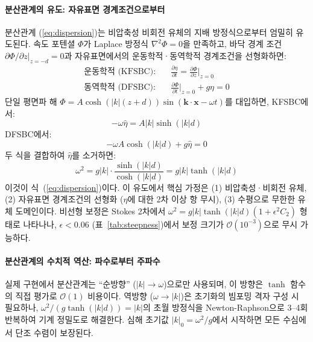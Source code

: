 \documentclass[11pt]{report}
\numberwithin{equation}{chapter}
\numberwithin{figure}{chapter}
\numberwithin{table}{chapter}
\begin{document}
\paragraph{분산관계의 유도: 자유표면 경계조건으로부터}
분산관계 (\ref{eq:dispersion})는 비압축성 비회전 유체의 지배 방정식으로부터 엄밀히 유도된다.
속도 포텐셜 $\Phi$가 Laplace 방정식 $\nabla^2\Phi = 0$을 만족하고,
바닥 경계 조건 $\partial\Phi/\partial z|_{z=-d} = 0$과
자유표면에서의 운동학적·동역학적 경계조건을 선형화하면:
\begin{align}
  \text{운동학적 (KFSBC):} \quad & \frac{\partial\eta}{\partial t} = \frac{\partial\Phi}{\partial z}\bigg|_{z=0}
  \label{eq:kfsbc} \\
  \text{동역학적 (DFSBC):} \quad & \frac{\partial\Phi}{\partial t}\bigg|_{z=0} + g\eta = 0
  \label{eq:dfsbc}
\end{align}
단일 평면파 해 $\Phi = A \cosh(|k|(z+d)) \sin(\mathbf{k}\cdot\mathbf{x} - \omega t)$를
대입하면, KFSBC에서:
\begin{equation}
  -\omega \hat{\eta} = A|k|\sinh(|k|d)
\end{equation}
DFSBC에서:
\begin{equation}
  -\omega A \cosh(|k|d) + g\hat{\eta} = 0
\end{equation}
두 식을 결합하여 $\hat{\eta}$를 소거하면:
\begin{equation}
  \omega^2 = g|k| \cdot \frac{\sinh(|k|d)}{\cosh(|k|d)} = g|k|\tanh(|k|d)
\end{equation}
이것이 식~(\ref{eq:dispersion})이다.
이 유도에서 핵심 가정은 (1) 비압축성·비회전 유체, (2) 자유표면 경계조건의 선형화
($\eta$에 대한 2차 이상 항 무시), (3) 수평으로 무한한 유체 도메인이다.
비선형 보정은 Stokes 2차에서 $\omega^2 = g|k|\tanh(|k|d)(1 + \epsilon^2 C_2)$
형태로 나타나나, $\epsilon < 0.06$ (표~\ref{tab:steepness})에서 보정 크기가
$\mathcal{O}(10^{-3})$으로 무시 가능하다.

\paragraph{분산관계의 수치적 역산: 파수로부터 주파수}
실제 구현에서 분산관계는 ``순방향'' ($|k| \to \omega$)으로만 사용되며,
이 방향은 $\tanh$ 함수의 직접 평가로 $\mathcal{O}(1)$ 비용이다.
역방향 ($\omega \to |k|$)은 초기화의 빔포밍 격자 구성 시 필요하나,
$\omega^2 / (g\tanh(|k|d)) = |k|$의 초월 방정식을 Newton-Raphson으로
3--4회 반복하여 기계 정밀도로 해결한다.
심해 초기값 $|k|_0 = \omega^2/g$에서 시작하면 모든 수심에서
단조 수렴이 보장된다.
\end{document}
